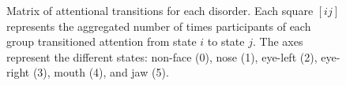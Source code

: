\documentclass{llncs}
\begin{document}
  \begin{figure}[t]
    \hfill
    \hfill
    \caption{Matrix of attentional transitions for each disorder. Each square $[ij]$ represents the aggregated number of times participants of each group transitioned attention from state $i$ to state $j$.  The axes represent the different states: non-face (0), nose (1), eye-left (2), eye-right (3), mouth (4), and jaw (5).}
    \label{fig:transitions}
    \vspace*{-\baselineskip}
  \end{figure}
\end{document}
